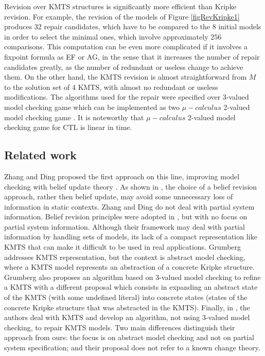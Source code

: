 \documentclass{llncs}
\begin{document}
Revision over KMTS structures is significantly more efficient than Kripke revision. For example, the revision of the models of Figure \ref{figRevKripke1} produces 32 repair candidates, which have to be compared to the 8 initial models in order to select the minimal ones, which involve approximately 256 comparisons. This computation can be even more complicated if it involves a fixpoint formula as EF or AG, in the sense that it increases the number of repair candidates greatly, as the number of redundant or useless change to achieve them. On the other hand, the KMTS revision is almost straightforward from $M$ to the solution set of 4 KMTS, with almost no redundant or useless modifications. The algorithms used for the repair were specified over 3-valued model checking game which can be implemented as two $\mu -calculus$ 2-valued model checking game \cite{GLLS07}. It is noteworthy that $\mu -calculus$ 2-valued model checking game for CTL is linear in time. %

\subsection{Related work}

Zhang and Ding \cite{ZD08} proposed the first approach on this line, improving model checking with belief update theory \cite{KM91}. As shown in \cite{GW10}, the choice of a belief revision approach, rather then belief update, may avoid some unnecessary loss of information in static contexts. Zhang and Ding \cite{ZD08} do not deal with partial system information. Belief revision principles were adopted in \cite{GW10}, but with no focus on partial system information. Although their framework may deal with partial information by handling sets of models, its lack of a compact representation like KMTS that can make it difficult to be used in real applications. Grumberg \cite{Gru11} addresses KMTS representation, but the context is abstract model checking, where a KMTS model represents an abstraction of a concrete Kripke structure. Grumberg also proposes an algorithm based on 3-valued model checking to refine a KMTS  with a different proposal  which consists in expanding an abstract state of the KMTS (with some undefined literal) into concrete states (states of the concrete Kripke structure that was abstracted in the KMTS). Finally, in \cite{CBSK12}, the authors deal with KMTS and develop an algorithm, not using 3-valued model checking, to repair KMTS models. Two main differences distinguish their approach from ours: the focus is on abstract model checking and not on partial system specification; and their proposal does not refer to a known change theory. 
\end{document}
